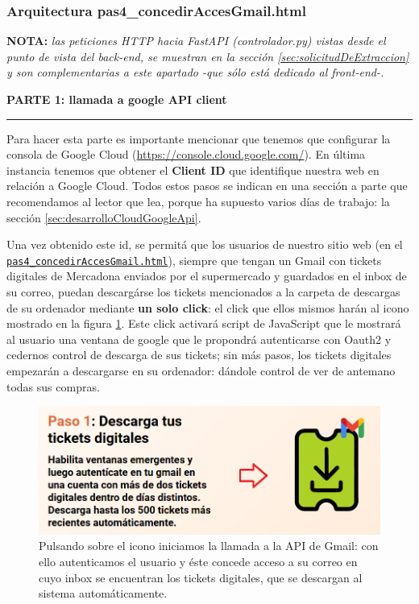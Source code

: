 \documentclass[a4paper,12pt]{report}
\begin{document}
	\subsubsection{Arquitectura pas4\_concedirAccesGmail.html}
	\label{sec:pas4googleAPIclient}
	
	
	\textbf{NOTA:} \textit{las peticiones HTTP hacia FastAPI (controlador.py) vistas desde el punto de vista del back-end, se muestran en la sección \ref{sec:solicitudDeExtraccion} y son complementarias a este apartado -que sólo está dedicado al front-end-.}
	
	
	
		
	\noindent \textbf{PARTE 1: llamada a google API client}
	\hrule
	\vspace{.5em}
	
	Para hacer esta parte es importante mencionar que tenemos que configurar la consola de Google Cloud (\href{https://console.cloud.google.com/}{https://console.cloud.google.com/}). En última instancia tenemos que obtener el \textbf{Client ID} que identifique nuestra web en relación a Google Cloud. Todos estos pasos se indican en una sección a parte que recomendamos al lector que lea, porque ha supuesto varios días de trabajo: la sección \ref{sec:desarrolloCloudGoogleApi}.
	
	Una vez obtenido este id, se permitá que los usuarios de nuestro sitio web (en el \href{https://github.com/blackcub3s/mercApp/blob/main/APP%20WEB/__frontend__produccio__/app/pas4_concedirAccesGmail.html}{\texttt{pas4\_concedirAccesGmail.html}}), siempre que tengan un Gmail con tickets digitales de Mercadona enviados por el supermercado y guardados en el inbox de su correo, puedan descargárse los tickets mencionados a la carpeta de descargas de su ordenador mediante \textbf{un solo click}: el click que ellos mismos harán al icono mostrado en la figura \ref{fig:pujarticketspas4}. Este click activará script de JavaScript que le mostrará al usuario una ventana de google que le propondrá autenticarse con Oauth2 y cedernos control de descarga de sus tickets; sin más pasos, los tickets digitales empezarán a descargarse en su ordenador: dándole control de ver de antemano todas sus compras.
	
	
	\begin{figure}[H]
		\centering
		\caption{Pulsando sobre el icono iniciamos la llamada a la API de Gmail: con ello autenticamos el usuario y éste concede acceso a su correo en cuyo inbox se encuentran los tickets digitales, que se descargan al sistema automáticamente.}
		\includegraphics[width=1\linewidth]{img/pujarTicketsPas4}

		\label{fig:pujarticketspas4}
	\end{figure}
	
\end{document}
